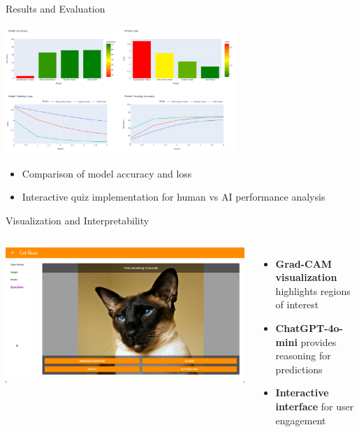 \documentclass{beamer}
\begin{document}
\begin{frame}{Results and Evaluation}
    \begin{center}
        \includegraphics[width=0.65\textwidth]{models.png}
    \end{center} 
    \begin{itemize}
        \item Comparison of model accuracy and loss
        \item Interactive quiz implementation for human vs AI performance analysis
    \end{itemize}
\end{frame}

\begin{frame}{Visualization and Interpretability}
    \begin{columns}[T]
        \includegraphics[width=\textwidth]{quiz.png}
        
        \begin{itemize}
            \item \textbf{Grad-CAM visualization} highlights regions of interest
            \item \textbf{ChatGPT-4o-mini} provides reasoning for predictions
            \item \textbf{Interactive interface} for user engagement
        \end{itemize}
    \end{columns}
\end{frame}
\end{document}

